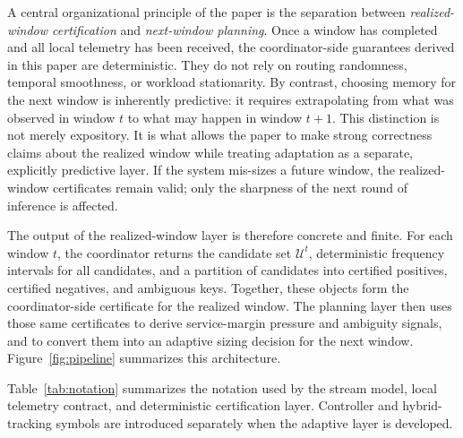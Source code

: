 \documentclass[sigconf, nonacm]{acmart}
\begin{document}
A central organizational principle of the paper is the separation between \emph{realized-window certification} and \emph{next-window planning}. Once a window has completed and all local telemetry has been received, the coordinator-side guarantees derived in this paper are deterministic. They do not rely on routing randomness, temporal smoothness, or workload stationarity. By contrast, choosing memory for the next window is inherently predictive: it requires extrapolating from what was observed in window \(t\) to what may happen in window \(t+1\). This distinction is not merely expository. It is what allows the paper to make strong correctness claims about the realized window while treating adaptation as a separate, explicitly predictive layer. If the system mis-sizes a future window, the realized-window certificates remain valid; only the sharpness of the next round of inference is affected.

The output of the realized-window layer is therefore concrete and finite. For each window \(t\), the coordinator returns the candidate set \(\mathcal{U}^t\), deterministic frequency intervals for all candidates, and a partition of candidates into certified positives, certified negatives, and ambiguous keys. Together, these objects form the coordinator-side certificate for the realized window. The planning layer then uses those same certificates to derive service-margin pressure and ambiguity signals, and to convert them into an adaptive sizing decision for the next window. Figure~\ref{fig:pipeline} summarizes this architecture.

Table~\ref{tab:notation} summarizes the notation used by the stream model,
local telemetry contract, and deterministic certification layer. Controller
and hybrid-tracking symbols are introduced separately when the adaptive layer
is developed.
\end{document}
